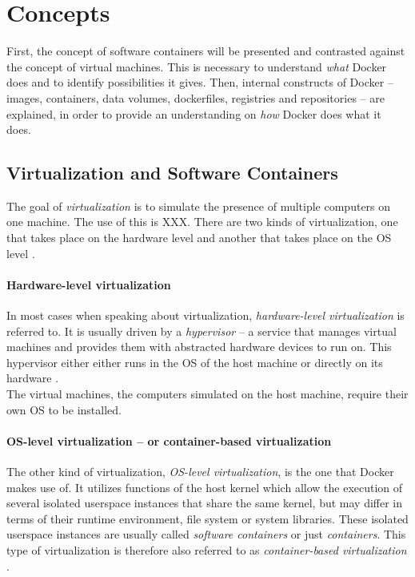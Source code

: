 
\section{Concepts} %
\label{sec:docker_concepts}

  First, the concept of software containers will be presented and contrasted against the concept of virtual machines. This is necessary to understand \emph{what} Docker does and to identify possibilities it gives. Then, internal constructs of Docker -- images, containers, data volumes, dockerfiles, registries and repositories -- are explained, in order to provide an understanding on \emph{how} Docker does what it does.

  \subsection{Virtualization and Software Containers} %
  \label{sub:virtualization_and_software_containers}
    The goal of \emph{virtualization} is to simulate the presence of multiple computers on one machine. The use of this is XXX. There are two kinds of virtualization, one that takes place on the hardware level and another that takes place on the \ac{OS} level \cite{Ruiz2015Performance}.

    \paragraph{Hardware-level virtualization} %
    \label{par:hardware_level_virtualization}
      In most cases when speaking about virtualization, \emph{hardware-level virtualization} is referred to. It is usually driven by a \emph{hypervisor} -- a service that manages virtual machines and provides them with abstracted hardware devices to run on. This hypervisor either either runs in the OS of the host machine or directly on its hardware \cite{Ruiz2015Performance}. \\
      The virtual machines, \ie the computers simulated on the host machine, require their own OS to be installed.

    \paragraph{OS-level virtualization -- or container-based virtualization} %
    \label{par:os_level_virtualization}
      The other kind of virtualization, \emph{OS-level virtualization}, is the one that Docker makes use of.
      It utilizes functions of the host kernel which allow the execution of several isolated userspace instances that share the same kernel, but may differ in terms of their runtime environment, \eg file system or system libraries. These isolated userspace instances are usually called \emph{software containers} or just \emph{containers}. This type of virtualization is therefore also referred to as \emph{container-based virtualization} \cite{Ruiz2015Performance}. \\

